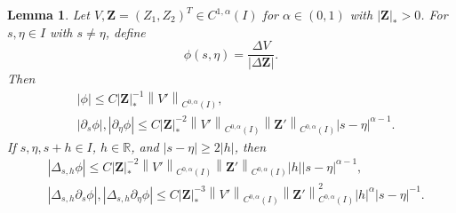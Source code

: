 \documentclass[11pt,reqno]{amsart}
\theoremstyle{plain}
\newtheorem{lemma}[theorem]{Lemma}
\theoremstyle{definition}
\numberwithin{equation}{section}
\newcommand{\p}{\partial}
\newcommand{\bm}[1]{\boldsymbol{#1}}
\newcommand{\abs}[1]{\left\lvert #1 \right\rvert}
\newcommand{\norm}[1]{\left\lVert #1 \right\rVert}
\newcommand{\R}{\mathbb{R}}
\newcommand{\ci}[1]{C^{#1}(I)}
\begin{document}
\begin{lemma}\label{lem-phi-ZV}
Let $V, \bm Z =(Z_1,Z_2)^T\in \ci{1,\alpha}$ for $\alpha\in(0,1)$ with
$\abs{\bm Z}_*>0$. For $s,\eta\in I$ with $s\ne\eta$, define
\begin{equation}
    \phi(s,\eta) = \frac{\Delta V}{\abs{\Delta\bm Z}}.
\end{equation}
Then
\begin{align}
    &\abs{\phi}\le C\abs{\bm Z}_*^{-1}\norm{V'}_{\ci{0,\alpha}},\label{eqn:phi-est-1}\\
    &\abs{\p_s\phi}, \abs{\p_\eta\phi} \le C \abs{\bm Z}_*^{-2}\norm{V'}_{\ci{0,\alpha}}\norm{\bm Z'}_{\ci{0,\alpha}}  \abs{s-\eta}^{\alpha-1}.\label{eqn:phi-est-2}
\end{align}
If $s,\eta,s+h\in I$, $h\in\R$, and
$\abs{s-\eta}\ge2\abs{h}$, then
\begin{align}
    &\abs{\Delta_{s,h}\phi} \le C  \abs{\bm Z}_*^{-2}\norm{V'}_{\ci{0,\alpha}}\norm{\bm Z'}_{\ci{0,\alpha}} \abs{h} \abs{s-\eta}^{\alpha-1},\label{eqn:phi-est-3}\\
    &\abs{\Delta_{s,h}\p_s\phi}, \abs{\Delta_{s,h}\p_\eta\phi} \le C\abs{\bm Z}_*^{-3}\norm{V'}_{\ci{0,\alpha}}\norm{\bm Z'}_{\ci{0,\alpha}}^2\abs{h}^\alpha\abs{s-\eta}^{-1} .\label{eqn:phi-est-4}
\end{align}
\end{lemma}
\end{document}
